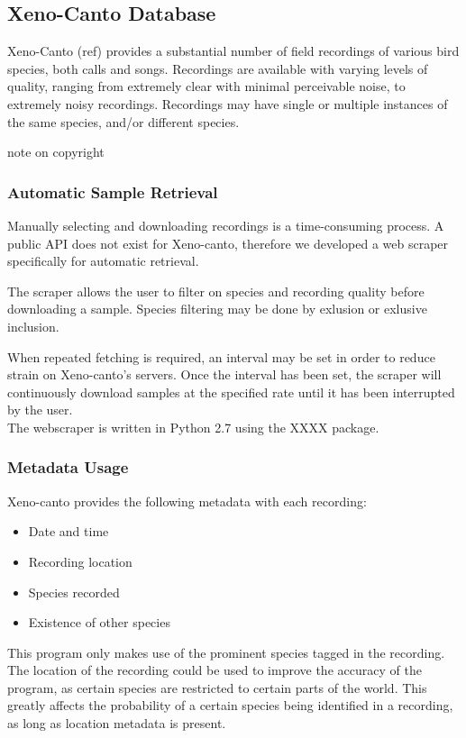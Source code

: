 \subsection{Xeno-Canto Database}
Xeno-Canto (ref) provides a substantial number of field recordings of various
bird species, both calls and songs.
Recordings are available with varying levels of quality, ranging from extremely
clear with minimal perceivable noise, to extremely noisy recordings.
Recordings may have single or multiple instances of the same species, and/or
different species.

note on copyright

\subsubsection{Automatic Sample Retrieval}
Manually selecting and downloading recordings is a time-consuming process.
A public API does not exist for Xeno-canto, therefore we developed a web scraper
specifically for automatic retrieval.

The scraper allows the user to filter on species and recording quality before
downloading a sample.
Species filtering may be done by exlusion or exlusive inclusion.

When repeated fetching is required, an interval may be set in order to reduce
strain on Xeno-canto's servers.
Once the interval has been set, the scraper will continuously download samples
at the specified rate until it has been interrupted by the user.\\

The webscraper is written in Python 2.7 using the XXXX package.

\subsubsection{Metadata Usage}
Xeno-canto provides the following metadata with each recording:
\begin{itemize}
  \item Date and time
  \item Recording location
  \item Species recorded
  \item Existence of other species
\end{itemize}

This program only makes use of the prominent species tagged in the recording.
The location of the recording could be used to improve the accuracy of the
program, as certain species are restricted to certain parts of the world.
This greatly affects the probability of a certain species being identified in
a recording, as long as location metadata is present.

